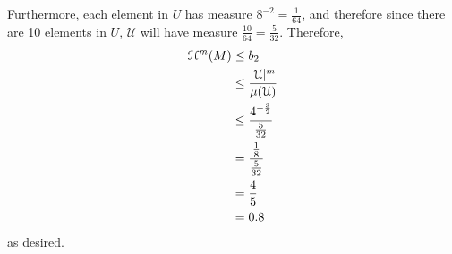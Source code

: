 Furthermore, each element in \(U\) has measure \(8^{-2} = \frac{1}{64}\), and therefore since there are 10 elements in \(U\), \(\mathcal{U}\) will have measure \(\frac{10}{64} = \frac{5}{32}\). Therefore,
\begin{align*}
    \mathcal{H}^m(M) &\leq b_2\\
    &\leq \frac{|\mathcal{U}|^m}{\mu(\mathcal{U})}\\
    &\leq \frac{4^{-\frac{3}{2}}}{\frac{5}{32}}\\
    &= \frac{\frac{1}{8}}{\frac{5}{32}}\\
    &= \frac{4}{5}\\
    &= 0.8
\end{align*}
as desired.